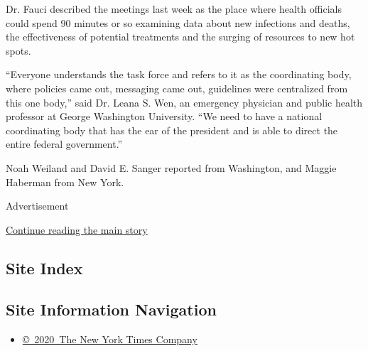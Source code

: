 Dr. Fauci described the meetings last week as the place where health
officials could spend 90 minutes or so examining data about new
infections and deaths, the effectiveness of potential treatments and the
surging of resources to new hot spots.

``Everyone understands the task force and refers to it as the
coordinating body, where policies came out, messaging came out,
guidelines were centralized from this one body,'' said Dr. Leana S. Wen,
an emergency physician and public health professor at George Washington
University. ``We need to have a national coordinating body that has the
ear of the president and is able to direct the entire federal
government.''

Noah Weiland and David E. Sanger reported from Washington, and Maggie
Haberman from New York.

Advertisement

\protect\hyperlink{after-bottom}{Continue reading the main story}

\hypertarget{site-index}{%
\subsection{Site Index}\label{site-index}}

\hypertarget{site-information-navigation}{%
\subsection{Site Information
Navigation}\label{site-information-navigation}}

\begin{itemize}
\tightlist
\item
  \href{https://help.nytimes3xbfgragh.onion/hc/en-us/articles/115014792127-Copyright-notice}{©~2020~The
  New York Times Company}
\end{itemize}

